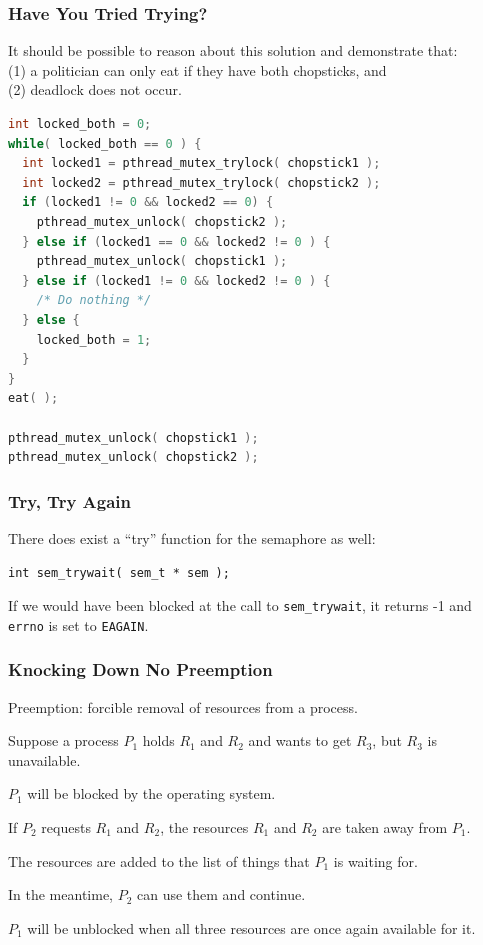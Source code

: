 \begin{frame}[fragile]
	\frametitle{Have You Tried Trying?}

	It should be possible to reason about this solution and demonstrate that:\\
	\quad (1) a politician can only eat if they have both chopsticks, and\\
	\quad (2) deadlock does not occur.

	\begin{lstlisting}[language=C]
int locked_both = 0;
while( locked_both == 0 ) {
  int locked1 = pthread_mutex_trylock( chopstick1 );
  int locked2 = pthread_mutex_trylock( chopstick2 );
  if (locked1 != 0 && locked2 == 0) {
    pthread_mutex_unlock( chopstick2 );
  } else if (locked1 == 0 && locked2 != 0 ) {
    pthread_mutex_unlock( chopstick1 );
  } else if (locked1 != 0 && locked2 != 0 ) {
    /* Do nothing */
  } else {
    locked_both = 1;
  }
}
eat( );

pthread_mutex_unlock( chopstick1 );
pthread_mutex_unlock( chopstick2 );
\end{lstlisting}

\end{frame}

\begin{frame}[fragile]
\frametitle{Try, Try Again}

There does exist a ``try'' function for the semaphore as well:

\begin{lstlisting}
int sem_trywait( sem_t * sem );
\end{lstlisting}

If we would have been blocked at the call to \texttt{sem\_trywait}, it returns -1 and \texttt{errno} is set to \texttt{EAGAIN}.

\end{frame}



\begin{frame}
	\frametitle{Knocking Down No Preemption}

	Preemption: forcible removal of resources from a process.

	Suppose a process $P_{1}$ holds $R_{1}$ and $R_{2}$ and wants to get $R_{3}$, but $R_{3}$ is unavailable.

	$P_{1}$ will be blocked by the operating system.

	If $P_{2}$ requests $R_{1}$ and $R_{2}$, the resources $R_{1}$ and $R_{2}$ are taken away from $P_{1}$.

	The resources are added to the list of things that $P_{1}$ is waiting for.

	In the meantime, $P_{2}$ can use them and continue.

	$P_{1}$ will be unblocked when all three resources are once again available for it.

\end{frame}



